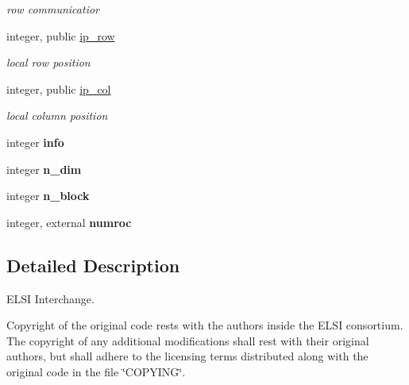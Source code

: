 \begin{DoxyCompactItemize}
\begin{DoxyCompactList}\small\item\em row communicatior \end{DoxyCompactList}\item 
\hypertarget{namespacempi__tools_ae77502fd07699453a77a86cc7608330b}{}integer, public \hyperlink{namespacempi__tools_ae77502fd07699453a77a86cc7608330b}{ip\+\_\+row}\label{namespacempi__tools_ae77502fd07699453a77a86cc7608330b}

\begin{DoxyCompactList}\small\item\em local row position \end{DoxyCompactList}\item 
\hypertarget{namespacempi__tools_ad6b4e5d662f966957335837321699b49}{}integer, public \hyperlink{namespacempi__tools_ad6b4e5d662f966957335837321699b49}{ip\+\_\+col}\label{namespacempi__tools_ad6b4e5d662f966957335837321699b49}

\begin{DoxyCompactList}\small\item\em local column position \end{DoxyCompactList}\item 
\hypertarget{namespacempi__tools_a7abd18507f3403e91e42fc739b4a8b1b}{}integer {\bfseries info}\label{namespacempi__tools_a7abd18507f3403e91e42fc739b4a8b1b}

\item 
\hypertarget{namespacempi__tools_acbc2f0ef45644bb20bfe5af7662fe45d}{}integer {\bfseries n\+\_\+dim}\label{namespacempi__tools_acbc2f0ef45644bb20bfe5af7662fe45d}

\item 
\hypertarget{namespacempi__tools_a877feb7ffc11725c8f33b76add2956f5}{}integer {\bfseries n\+\_\+block}\label{namespacempi__tools_a877feb7ffc11725c8f33b76add2956f5}

\item 
\hypertarget{namespacempi__tools_a3affe5df388ed8093ebfd5d87f8c2827}{}integer, external {\bfseries numroc}\label{namespacempi__tools_a3affe5df388ed8093ebfd5d87f8c2827}

\end{DoxyCompactItemize}


\subsection{Detailed Description}
E\+L\+S\+I Interchange. 

Copyright of the original code rests with the authors inside the E\+L\+S\+I consortium. The copyright of any additional modifications shall rest with their original authors, but shall adhere to the licensing terms distributed along with the original code in the file \char`\"{}\+C\+O\+P\+Y\+I\+N\+G\char`\"{}. 

